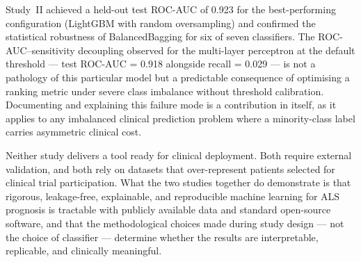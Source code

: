 Study~II achieved a held-out test \gls{ROC-AUC} of 0.923 for the best-performing configuration (LightGBM with random oversampling) and confirmed the statistical robustness of BalancedBagging for six of seven classifiers. The \gls{ROC-AUC}--sensitivity decoupling observed for the multi-layer perceptron at the default threshold --- test \gls{ROC-AUC} = 0.918 alongside recall = 0.029 --- is not a pathology of this particular model but a predictable consequence of optimising a ranking metric under severe class imbalance without threshold calibration. Documenting and explaining this failure mode is a contribution in itself, as it applies to any imbalanced clinical prediction problem where a minority-class label carries asymmetric clinical cost.

Neither study delivers a tool ready for clinical deployment. Both require external validation, and both rely on datasets that over-represent patients selected for clinical trial participation. What the two studies together do demonstrate is that rigorous, leakage-free, explainable, and reproducible machine learning for \gls{ALS} prognosis is tractable with publicly available data and standard open-source software, and that the methodological choices made during study design --- not the choice of classifier --- determine whether the results are interpretable, replicable, and clinically meaningful.
